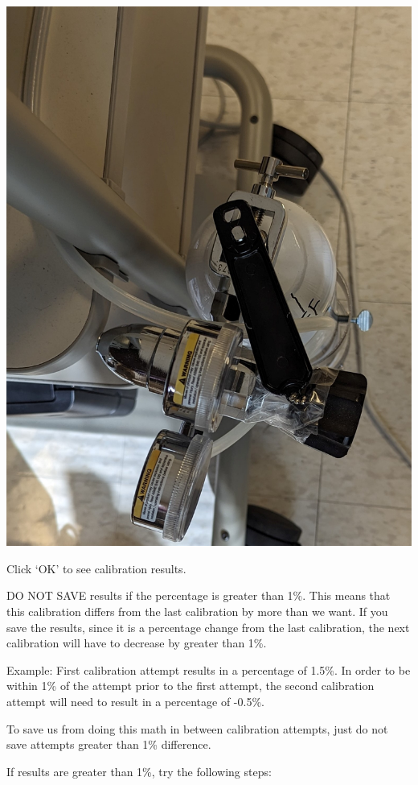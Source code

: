 \documentclass[
]{book}
\begin{document}
\includegraphics[width=1\linewidth]{images/parvocalibration/gas_off}

Click `OK' to see calibration results.

DO NOT SAVE results if the percentage is greater than 1\%. This means that this calibration differs from the last calibration by more than we want. If you save the results, since it is a percentage change from the last calibration, the next calibration will have to decrease by greater than 1\%.

Example: First calibration attempt results in a percentage of 1.5\%. In order to be within 1\% of the attempt prior to the first attempt, the second calibration attempt will need to result in a percentage of -0.5\%.

To save us from doing this math in between calibration attempts, just do not save attempts greater than 1\% difference.

If results are greater than 1\%, try the following steps:
\end{document}
